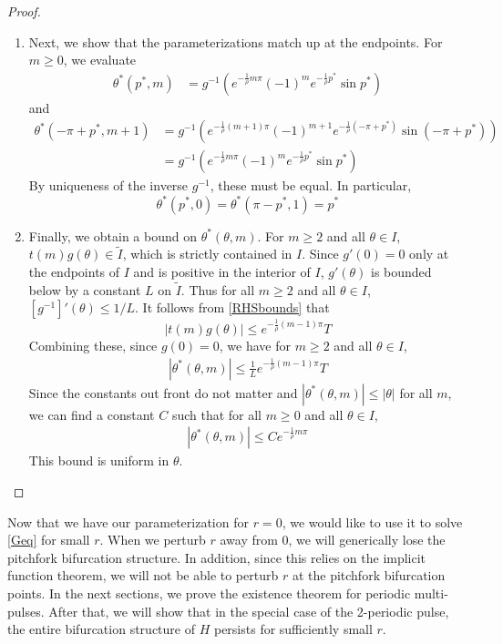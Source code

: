 \documentclass[thesis.tex]{subfiles}
\begin{document}
\begin{lemma}
\begin{proof}
\begin{enumerate}
\item Next, we show that the parameterizations match up at the endpoints. For $m \geq 0$, we evaluate
\begin{align*}
\theta^*(p^*, m) &= g^{-1}\left( e^{-\frac{1}{\rho}m \pi} (-1)^m e^{-\frac{1}{\rho}p^*} \sin p^* \right)
\end{align*}
and
\begin{align*}
\theta^*(-\pi + p^*, m+1) &= g^{-1}\left( e^{-\frac{1}{\rho}(m+1) \pi} (-1)^{m+1} e^{-\frac{1}{\rho}(-\pi + p^*)} \sin (-\pi + p^*) \right) \\
&=g^{-1}\left( e^{-\frac{1}{\rho}m \pi} (-1)^m e^{-\frac{1}{\rho}p^*} \sin p^* \right)
\end{align*}
By uniqueness of the inverse $g^{-1}$, these must be equal. In particular, 
\[
\theta^*(p^*, 0) = \theta^*(\pi - p^*, 1) = p^*
\]

\item Finally, we obtain a bound on $\theta^*(\theta, m)$. For $m \geq 2$ and all $\theta \in I$, $t(m)g(\theta) \in \tilde{I}$, which is strictly contained in $I$. Since $g'(0) = 0$ only at the endpoints of $I$ and is positive in the interior of $I$, $g'(\theta)$ is bounded below by a constant $L$ on $\tilde{I}$. Thus for all $m \geq 2$ and all $\theta \in I$, $[g^{-1}]'(\theta) \leq 1/L$. It follows from \cref{RHSbounds} that 
\[
|t(m)g(\theta)| \leq e^{-\frac{1}{\rho}(m - 1)\pi}T
\]
Combining these, since $g(0) = 0$, we have for $m \geq 2$ and all $\theta \in I$, 
\begin{align*}
|\theta^*(\theta, m)| \leq \frac{1}{L}e^{-\frac{1}{\rho}(m - 1)\pi}T
\end{align*}
Since the constants out front do not matter and $|\theta^*(\theta, m)| \leq |\theta|$ for all $m$, we can find a constant $C$ such that for all $m \geq 0$ and all $\theta \in I$,
\begin{align*}
|\theta^*(\theta, m)| \leq C e^{-\frac{1}{\rho} m \pi}
\end{align*}
This bound is uniform in $\theta$.
\end{enumerate}

\end{proof}
\end{lemma}

Now that we have our parameterization for $r = 0$, we would like to use it to solve \eqref{Geq} for small $r$. When we perturb $r$ away from 0, we will generically lose the pitchfork bifurcation structure. In addition, since this relies on the implicit function theorem, we will not be able to perturb $r$ at the pitchfork bifurcation points. In the next sections, we prove the existence theorem for periodic multi-pulses. After that, we will show that in the special case of the 2-periodic pulse, the entire bifurcation structure of $H$ persists for sufficiently small $r$.
\end{document}
